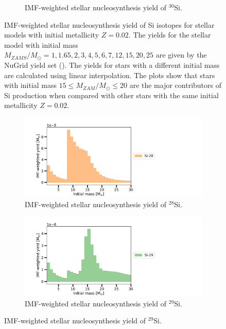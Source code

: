\documentclass{brandeis-thesis3.2}
\def \msun {M_{\odot}}
\newcommand{\iso}[2]{$^{#1}${#2}}
\begin{document}
\begin{figure}[H]
\begin{subfigure}[c]{0.6\textwidth}
        \caption{IMF-weighted stellar nucleosynthesis yield of \iso{30}{Si}.}
    \end{subfigure}
    \caption{IMF-weighted stellar nucleosynthesis yield of Si isotopes for stellar models with initial metallicity $Z=0.02$. The yields for the stellar model with initial mass $M_{ZAMS}/\msun = 1, 1.65, 2, 3, 4, 5, 6, 7, 12, 15, 20, 25$ are given by the NuGrid yield set (\citealt{Ritter_2018}). The yields for stars with a different initial mass are calculated using linear interpolation. The plots show that stars with initial mass $15\leq M_{ZAM}/\msun \leq 20$ are the major contributors of Si production when compared with other stars with the same initial metallicity $Z=0.02$.}
    \label{fig:imf_yield_0.02}
\end{figure}

\begin{figure}[H]
    \begin{subfigure}[c]{0.6\textwidth}
        \includegraphics[width=\textwidth]{figs/Si-28_Z=0.01_yield.pdf}
        \caption{IMF-weighted stellar nucleosynthesis yield of \iso{28}{Si}.}
    \end{subfigure}
    \begin{subfigure}[c]{0.6\textwidth}
        \includegraphics[width=\textwidth]{figs/Si-29_Z=0.01_yield.pdf}
        \caption{IMF-weighted stellar nucleosynthesis yield of \iso{29}{Si}.}

\end{subfigure}
\end{figure}
\end{document}
